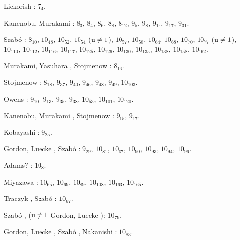 \begin{compactitem}
\item Lickorish \cite{lickorish85}: $7_{4}$.
%
\item Kanenobu, Murakami \cite{kanenobumurakami86}: $8_{3}$, $8_{4}$, $8_{6}$, $8_{8}$, $8_{12}$, $9_{5}$, $9_{8}$, $9_{15}$, $9_{17}$, $9_{31}$.
%
%
\item Szabó \cite{szabo05}: $8_{10}$, $10_{48}$, $10_{52}$, $10_{54}$ ($\operatorname{u} \neq 1$), $10_{57}$, $10_{58}$, $10_{64}$, $10_{68}$, $10_{70}$, $10_{77}$ ($\operatorname{u} \neq 1$), $10_{110}$, $10_{112}$, $10_{116}$, $10_{117}$, $10_{125}$, $10_{126}$, $10_{130}$, $10_{135}$, $10_{138}$, $10_{158}$, $10_{162}$.
%
\item Murakami, Yasuhara \cite{yasuhara00}, Stojmenow \cite{stoimenow04}: $8_{16}$.
%
%
\item Stojmenow \cite{stoimenow04}: $8_{18}$, $9_{37}$, $9_{40}$, $9_{46}$, $9_{48}$, $9_{49}$, $10_{103}$.
\item Owens \cite{owens08}: $9_{10}$, $9_{13}$, $9_{35}$, $9_{38}$, $10_{53}$, $10_{101}$, $10_{120}$.
%
\item Kanenobu, Murakami \cite{kanenobumurakami86}, Stojmenow \cite{stoimenow04}: $9_{15}$, $9_{17}$.
\item Kobayashi \cite{kobayashi89}: $9_{25}$.
%
\item Gordon, Luecke \cite{gordon06}, Szabó \cite{szabo05}: $9_{29}$, $10_{81}$, $10_{87}$, $10_{90}$, $10_{93}$, $10_{94}$, $10_{96}$.
%
%
\item Adams? \cite[s. 62]{adams94}: $10_{8}$.
%
\item Miyazawa \cite{miyazawa98}: $10_{65}$, $10_{69}$, $10_{89}$, $10_{108}$, $10_{163}$, $10_{165}$.
%
\item Traczyk \cite{traczyk99}, Szabó \cite{szabo05}: $10_{67}$.
%
\item Szabó \cite{szabo05}, ($\operatorname{u} \neq 1$ Gordon, Luecke \cite{gordon06}): $10_{79}$.
\item Gordon, Luecke \cite{gordon06}, Szabó \cite{szabo05}, Nakanishi \cite{nakanishi05}: $10_{83}$.
%

\end{compactitem}
